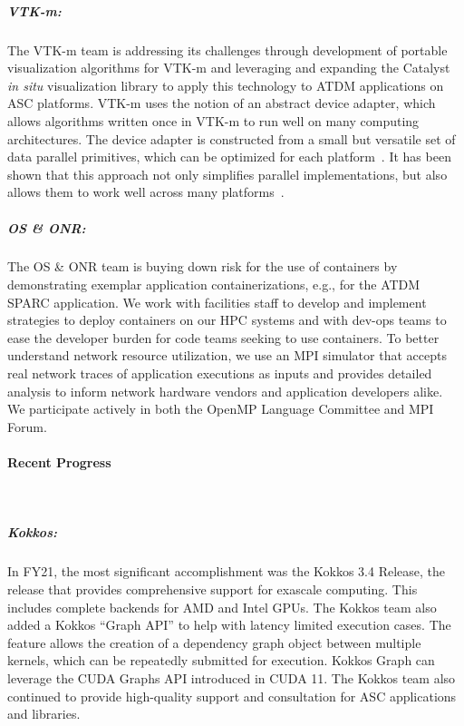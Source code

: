 \subparagraph{VTK-m:} The VTK-m team is addressing its challenges through
development of portable visualization algorithms for VTK-m and leveraging and
expanding the Catalyst~\cite{Catalyst}  \emph{in situ} visualization library to
apply this technology to ATDM applications on ASC platforms.  VTK-m uses the
notion of an abstract device adapter, which allows algorithms written once in
VTK-m to run well on many computing architectures.  The device adapter is
constructed from a small but versatile set of data parallel primitives, which
can be optimized for each platform~\cite{Blelloch1990}.  It has been shown that
this approach not only simplifies parallel implementations, but also allows
them to work well across many platforms~\cite{Lo2012,Larsen2015,Moreland2015}.

\subparagraph{OS \& ONR:} The OS \& ONR team is buying down risk for the use of containers by demonstrating exemplar application containerizations, e.g., for the ATDM SPARC application.  We work with facilities staff to develop and implement strategies to deploy containers on our HPC systems and with dev-ops teams to ease the developer burden for code teams seeking to use containers.  To better understand network resource utilization, we use an MPI simulator that accepts real network traces of application executions as inputs and provides detailed analysis to inform network hardware vendors and application developers alike.  We participate actively in both the OpenMP Language Committee and MPI Forum.



\paragraph{Recent Progress} \leavevmode \\


\subparagraph{Kokkos:}  In FY21, the most significant accomplishment was the Kokkos 3.4 Release, the release that provides comprehensive support for exascale computing.  This includes complete backends for AMD and Intel GPUs.  The Kokkos team also added a Kokkos “Graph API” to help with latency limited execution cases.  The feature allows the creation of a dependency graph object between multiple kernels, which can be repeatedly submitted for execution. Kokkos Graph can leverage the CUDA Graphs API introduced in CUDA 11.  The Kokkos team also continued to provide high-quality support and consultation for ASC applications and libraries.


